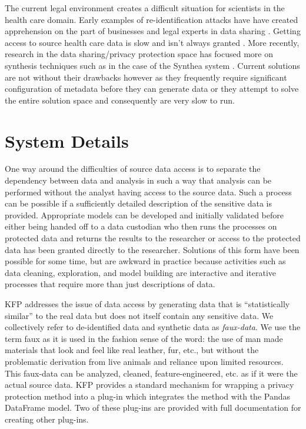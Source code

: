 \documentclass{article}
\begin{document}
The current legal environment creates a difficult situation for scientists in the health care domain. Early examples of re-identification attacks \cite{sweeney_2002} have have created apprehension on the part of businesses and legal experts in data sharing \cite{ohm_broken_2009}. Getting access to source health care data is slow and isn't always granted \cite{hodge_legal_1999, committee_hipaa_privacy_rule_2009}. More recently, research in the data sharing/privacy protection space has focused more on synthesis techniques such as in the case of the Synthea system \cite{walonoski_synthea_2018}. Current solutions are not without their drawbacks however as they frequently require significant configuration of metadata before they can generate data or they attempt to solve the entire solution space and consequently are very slow to run.

\section{System Details}

One way around the difficulties of source data access is to separate the dependency between data and analysis in such a way that analysis can be performed without the analyst having access to the source data. Such a process can be possible if a sufficiently detailed description of the sensitive data is provided. Appropriate models can be developed and initially validated before either being handed off to a data custodian who then runs the processes on protected data and returns the results to the researcher or access to the protected data has been granted directly to the researcher. Solutions of this form have been possible for some time, but are awkward in practice because activities such as data cleaning, exploration, and model building are interactive and iterative processes that require more than just descriptions of data.

KFP addresses the issue of data access by generating data that is ``statistically similar'' to the real data but does not itself contain any sensitive data. We collectively refer to de-identified data and synthetic data as \emph{faux-data}. We use the term faux as it is used in the fashion sense of the word: the use of man made materials that look and feel like real leather, fur, etc., but without the problematic derivation from live animals and reliance upon limited resources. This faux-data can be analyzed, cleaned, feature-engineered, etc. as if it were the actual source data. KFP provides a standard mechanism for wrapping a privacy protection method into a plug-in which integrates the method with the Pandas DataFrame model. Two of these plug-ins are provided with full documentation for creating other plug-ins.
\end{document}

